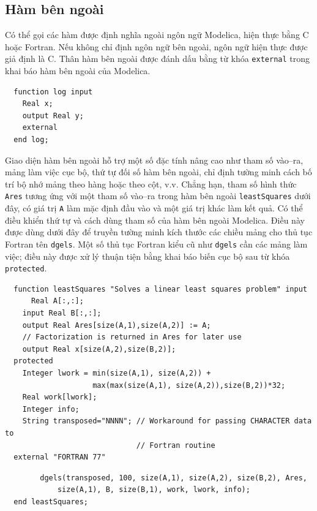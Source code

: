 \subsection{Hàm bên ngoài}
Có thể gọi các hàm được định nghĩa ngoài ngôn ngữ Modelica, hiện thực bằng C hoặc Fortran. Nếu không chỉ định ngôn ngữ bên ngoài, ngôn ngữ hiện thực được giả định là C. Thân hàm bên ngoài được đánh dấu bằng từ khóa \texttt{external} trong khai báo hàm bên ngoài của Modelica.
\begin{verbatim}
  function log input
    Real x;
    output Real y;
    external
  end log;
\end{verbatim}
Giao diện hàm bên ngoài hỗ trợ một số đặc tính nâng cao như tham số vào--ra, mảng làm việc cục bộ, thứ tự đối số hàm bên ngoài, chỉ định tường minh cách bố trí bộ nhớ mảng theo hàng hoặc theo cột, v.v. Chẳng hạn, tham số hình thức \texttt{Ares} tương ứng với một tham số vào--ra trong hàm bên ngoài \texttt{leastSquares} dưới đây, có giá trị \texttt{A} làm mặc định đầu vào và một giá trị khác làm kết quả. Có thể điều khiển thứ tự và cách dùng tham số của hàm bên ngoài Modelica. Điều này được dùng dưới đây để truyền tường minh kích thước các chiều mảng cho thủ tục Fortran tên \texttt{dgels}. Một số thủ tục Fortran kiểu cũ như \texttt{dgels} cần các mảng làm việc; điều này được xử lý thuận tiện bằng khai báo biến cục bộ sau từ khóa \texttt{protected}.
\begin{verbatim}
  function leastSquares "Solves a linear least squares problem" input
      Real A[:,:];
    input Real B[:,:];
    output Real Ares[size(A,1),size(A,2)] := A;
    // Factorization is returned in Ares for later use
    output Real x[size(A,2),size(B,2)];
  protected
    Integer lwork = min(size(A,1), size(A,2)) +
                    max(max(size(A,1), size(A,2)),size(B,2))*32;
    Real work[lwork];
    Integer info;
    String transposed="NNNN"; // Workaround for passing CHARACTER data to
                              // Fortran routine
  external "FORTRAN 77"
\end{verbatim}

\begin{verbatim}
        dgels(transposed, 100, size(A,1), size(A,2), size(B,2), Ares,
            size(A,1), B, size(B,1), work, lwork, info);
  end leastSquares;
\end{verbatim}

